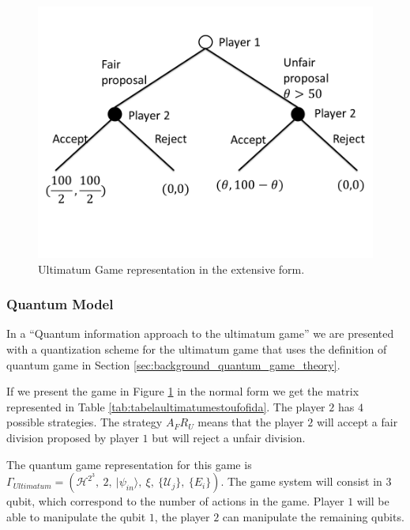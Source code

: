 \begin{figure}[h]
\centering 
\includegraphics[scale=0.35]{Figures/ultimatum/gametree.png}
\caption{Ultimatum Game representation in the extensive form. }
\label{fig:ultimatum:gametree}
\end{figure}

\subsubsection{Quantum Model}
\label{subsec:ultimatum}

In a ``Quantum information approach to the ultimatum game''\cite{Fra2011} we are presented with a quantization scheme for the ultimatum game that uses the definition of quantum game in Section \ref{sec:background_quantum_game_theory}. 

If we present the game in Figure \ref{fig:ultimatum:gametree} in the normal form we get the matrix represented in Table \ref{tab:tabelaultimatumestoufofida}. The player $2$ has $4$ possible strategies. The strategy $A_{F}R_{U}$ means that the player $2$ will accept a fair division proposed by player $1$ but will reject a unfair division.

 The quantum game representation for this game is $
\Gamma_{Ultimatum}=(\mathcal{H}^{2^{3}},\: 2,\:\vert\psi_{in}\rangle,\:\xi,\:\{\mathcal{U}_{j}\},\:\{E_{i}\})\label{eq:quantum_game_six_tuple}
$. The game system will consist in $3$ qubit, which correspond to the number of actions in the game. Player $1$ will be able to manipulate the qubit $1$, the player $2$ can manipulate the remaining qubits. 



